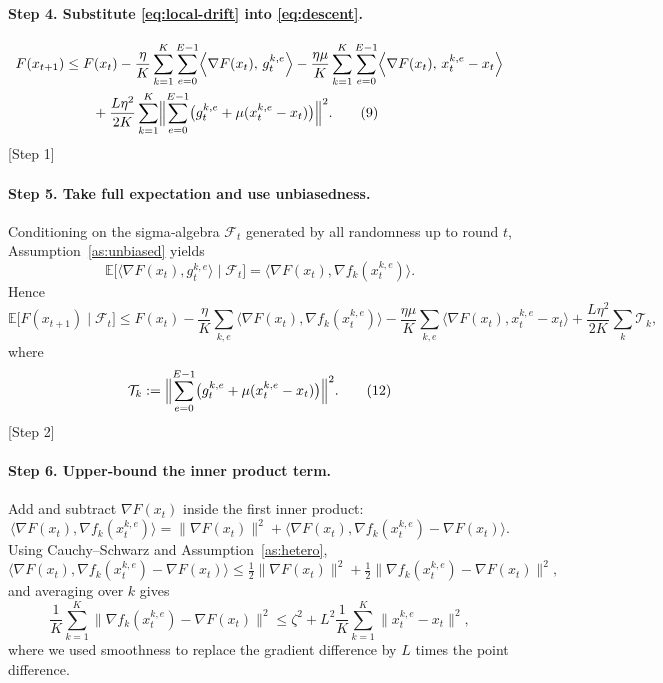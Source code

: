 \documentclass{article}
\newcommand{\E}{\mathbb{E}}
\begin{document}
\paragraph{Step 4. Substitute \eqref{eq:local-drift} into \eqref{eq:descent}.}
\begin{align}
F(x_{t+1})
&\le F(x_t)
-\frac{\eta}{K}\sum_{k=1}^{K}\sum_{e=0}^{E-1}
\Bigl\langle\nabla F(x_t),\,g_{t}^{k,e}\Bigr\rangle
-\frac{\eta\mu}{K}\sum_{k=1}^{K}\sum_{e=0}^{E-1}
\Bigl\langle\nabla F(x_t),\,x_{t}^{k,e}-x_t\Bigr\rangle \nonumber\\
&\qquad
+\frac{L\eta^{2}}{2K}\sum_{k=1}^{K}
\Bigl\|\sum_{e=0}^{E-1}\bigl(g_{t}^{k,e}
+\mu(x_{t}^{k,e}-x_t)\bigr)\Bigr\|^{2}.
\tag{9}\label{eq:expand}
\end{align}
[Step 1]

\paragraph{Step 5. Take full expectation and use unbiasedness.}
Conditioning on the sigma‑algebra $\mathcal{F}_t$ generated by all randomness up to round $t$, Assumption~\ref{as:unbiased} yields
\[
\E\!\bigl[\langle\nabla F(x_t),g_{t}^{k,e}\rangle\mid\mathcal{F}_t\bigr]
= \bigl\langle\nabla F(x_t),\nabla f_k(x_{t}^{k,e})\bigr\rangle.
\tag{10}
\]
Hence
\[
\E\!\bigl[F(x_{t+1})\mid\mathcal{F}_t\bigr]
\le F(x_t)
-\frac{\eta}{K}\sum_{k,e}
\bigl\langle\nabla F(x_t),\nabla f_k(x_{t}^{k,e})\bigr\rangle
-\frac{\eta\mu}{K}\sum_{k,e}
\bigl\langle\nabla F(x_t),x_{t}^{k,e}-x_t\bigr\rangle
+ \frac{L\eta^{2}}{2K}\sum_{k}
\mathcal{T}_k,
\tag{11}
\]
where
\[
\mathcal{T}_k
:=\Bigl\|\sum_{e=0}^{E-1}\bigl(g_{t}^{k,e}
+\mu(x_{t}^{k,e}-x_t)\bigr)\Bigr\|^{2}.
\tag{12}
\]
[Step 2]

\paragraph{Step 6. Upper‑bound the inner product term.}
Add and subtract $\nabla F(x_t)$ inside the first inner product:
\[
\bigl\langle\nabla F(x_t),\nabla f_k(x_{t}^{k,e})\bigr\rangle
=\|\nabla F(x_t)\|^{2}
+\bigl\langle\nabla F(x_t),\nabla f_k(x_{t}^{k,e})-\nabla F(x_t)\bigr\rangle.
\tag{13}
\]
Using Cauchy–Schwarz and Assumption~\ref{as:hetero},
\[
\bigl\langle\nabla F(x_t),\nabla f_k(x_{t}^{k,e})-\nabla F(x_t)\bigr\rangle
\le \tfrac12\|\nabla F(x_t)\|^{2}
+\tfrac12\|\nabla f_k(x_{t}^{k,e})-\nabla F(x_t)\|^{2},
\tag{14}
\]
and averaging over $k$ gives
\[
\frac1K\sum_{k=1}^{K}\|\nabla f_k(x_{t}^{k,e})-\nabla F(x_t)\|^{2}
\le \zeta^{2}+L^{2}\frac1K\sum_{k=1}^{K}\|x_{t}^{k,e}-x_t\|^{2},
\tag{15}
\]
where we used smoothness to replace the gradient difference by $L$ times the point difference.
\end{document}

